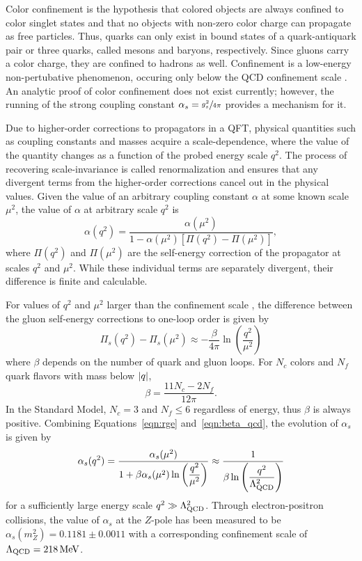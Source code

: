 Color confinement is the hypothesis that colored objects are always confined to color singlet states and that no objects with non-zero color charge can propagate as free particles.
Thus, quarks can only exist in bound states of a quark-antiquark pair or three quarks, called mesons and baryons, respectively. 
Since gluons carry a color charge, they are confined to hadrons as well.
Confinement is a low-energy non-pertubative phenomenon, occuring only below the QCD confinement scale \lqcd. 
An analytic proof of color confinement does not exist currently; however, the running of the strong coupling constant $\alpha_s = \sfrac{g_s^2}{4\pi}$ provides a mechanism for it.

Due to higher-order corrections to propagators in a QFT, physical quantities such as coupling constants and masses acquire a scale-dependence, where the value of the quantity changes as a function of the probed energy scale $q^2$.
The process of recovering scale-invariance is called renormalization and ensures that any divergent terms from the higher-order corrections cancel out in the physical values.
Given the value of an arbitrary coupling constant $\alpha$ at some known scale $\mu^2$, the value of $\alpha$ at arbitrary scale $q^2$ is  
\begin{equation}
  \label{eqn:rge}
  \alpha (q^2) = \frac{\alpha(\mu^2)}{1 - \alpha(\mu^2) \left[ \Pi(q^2) - \Pi(\mu^2) \right]},
\end{equation}
where $\Pi(q^2)$ and $\Pi(\mu^2)$ are the self-energy correction of the propagator at scales $q^2$ and $\mu^2$.
While these individual terms are separately divergent, their difference is finite and calculable. 

For values of $q^2$ and $\mu^2$ larger than the confinement scale \lqcd, the difference between the gluon self-energy corrections to one-loop order is given by 
\begin{equation}
  \label{eqn:beta_qcd}
  \Pi_s(q^2) - \Pi_s(\mu^2) \approx - \frac{\beta}{4\pi} \ln \left( \dfrac{q^2}{\mu^2} \right)
\end{equation}
where $\beta$ depends on the number of quark and gluon loops.
For $N_c$ colors and $N_f$ quark flavors with mass below $\lvert q \rvert$,
\begin{equation}
  \beta = \frac{11 N_c - 2 N_f}{12 \pi}. 
\end{equation}
In the Standard Model, $N_c = 3$ and $N_f \le 6$ regardless of energy, thus $\beta$ is always positive.
Combining Equations~\ref{eqn:rge} and~\ref{eqn:beta_qcd}, the evolution of $\alpha_s$ is given by
\begin{equation}
  \label{eqn:alpha_s}
  \alpha_s (q^2) = \frac{\alpha_s(\mu^2)}{1 + \beta \alpha_s (\mu^2) \ln \left( \dfrac{q^2}{\mu^2} \right)} \approx \frac{1}{\beta \ln \left( \dfrac{q^2}{\Lambda_{\text{QCD}}^2} \right)}
\end{equation}
for a sufficiently large energy scale $q^2 \gg \Lambda_{\text{QCD}}^2$.
Through electron-positron collisions, the value of $\alpha_s$ at the $Z$-pole has been measured to be $\alpha_s (m_Z^2) = 0.1181 \pm 0.0011$ with a corresponding confinement scale of $\Lambda_{\text{QCD}} = 218\,\text{Me\hspace{-.08em}V}$.  

